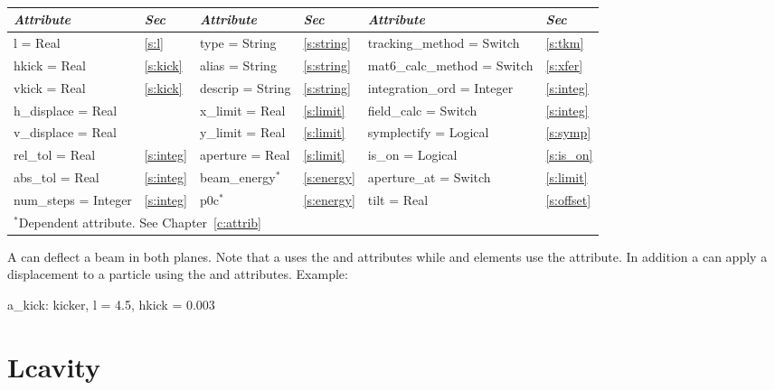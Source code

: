 {{\begin{center}
\tt
\begin{tabular}{|l|l||l|l||l|l|} \hline
  {\sl Attribute} & {\sl Sec} & {\sl Attribute} & {\sl Sec}&  {\sl Attribute} & {\sl Sec} \\ \hline
  l        = Real       & \ref{s:l}       & type = String      & \ref{s:string} & tracking\_method = Switch    & \ref{s:tkm}    \\ \hline
  hkick    = Real       & \ref{s:kick}    & alias = String     & \ref{s:string} & mat6\_calc\_method = Switch  & \ref{s:xfer}   \\ \hline
  vkick    = Real       & \ref{s:kick}    & descrip = String   & \ref{s:string} & integration\_ord = Integer   & \ref{s:integ}  \\ \hline
  h\_displace = Real    &                 & x\_limit = Real    & \ref{s:limit}  & field\_calc = Switch         & \ref{s:integ}  \\ \hline 
  v\_displace = Real    &                 & y\_limit = Real    & \ref{s:limit}  & symplectify = Logical        & \ref{s:symp}   \\ \hline
  rel\_tol = Real       & \ref{s:integ}   & aperture = Real    & \ref{s:limit}  & is\_on = Logical             & \ref{s:is_on}  \\ \hline
  abs\_tol = Real       & \ref{s:integ}   & beam\_energy$^*$   & \ref{s:energy} & aperture\_at = Switch        & \ref{s:limit}  \\ \hline
  num\_steps = Integer  & \ref{s:integ}   & p0c$^*$            & \ref{s:energy} & tilt     = Real              & \ref{s:offset} \\ \hline
  \multicolumn{6}{l}{\small $^*$Dependent attribute. See Chapter~\ref{c:attrib}} \\
\end{tabular}
\end{center}
\toffset

A  can deflect a beam in both planes. Note that a
 uses the  and  attributes while
 and  elements use the  attribute. 
In addition a  can apply a displacement to a particle
using the  and  attributes.
Example:
\begin{example}
  a_kick: kicker, l = 4.5, hkick = 0.003
\end{example}

\section{Lcavity}
\label{s:lcav}

}}
